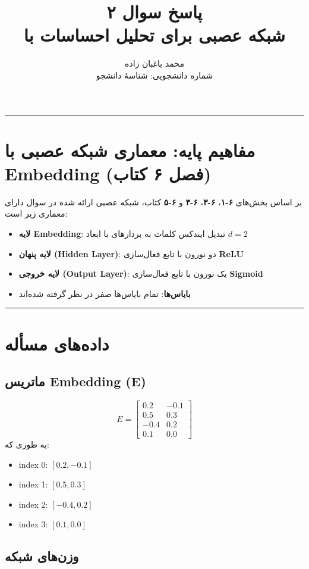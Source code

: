 \documentclass[11pt,a4paper]{article}
\title{\textbf{پاسخ سوال ۲} \\[0.4cm] \small شبکه عصبی برای تحلیل احساسات با \en{Embedding}}
\author{محمد باغبان زاده \\ شماره دانشجویی: شناسهٔ دانشجو}
\date{}
\newcommand{\en}[1]{\textenglish{#1}}
\newcommand{\separator}{\vspace{1em}\noindent\rule{\linewidth}{0.4pt}\vspace{1em}}
\newcommand{\thickseparator}{\vspace{1em}\noindent\rule{\linewidth}{1pt}\vspace{1em}}
\begin{document}
\maketitle
\thickseparator

\section{مفاهیم پایه: معماری شبکه عصبی با \en{Embedding} (فصل \en{۶} کتاب)}

بر اساس بخش‌های \textbf{\en{۶-۱}}، \textbf{\en{۶-۳}}، \textbf{\en{۶-۴}} و \textbf{\en{۶-۵}} کتاب، شبکه عصبی ارائه شده در سوال دارای معماری زیر است:

\begin{itemize}
    \item \textbf{لایه \en{Embedding}}: تبدیل ایندکس کلمات به بردارهای با ابعاد \(d=2\)
    \item \textbf{لایه پنهان (\en{Hidden Layer})}: دو نورون با تابع فعال‌سازی \textbf{\en{ReLU}}
    \item \textbf{لایه خروجی (\en{Output Layer})}: یک نورون با تابع فعال‌سازی \textbf{\en{Sigmoid}}
    \item \textbf{بایاس‌ها}: تمام بایاس‌ها صفر در نظر گرفته شده‌اند
\end{itemize}

\separator
\section{داده‌های مسأله}

\subsection{ماتریس \en{Embedding} (E)}
\[
E = 
\begin{bmatrix}
0.2 & -0.1 \\
0.5 & 0.3 \\
-0.4 & 0.2 \\
0.1 & 0.0
\end{bmatrix}
\]
به طوری که:
\begin{itemize}
    \item \en{index 0}: \( [0.2, -0.1] \)
    \item \en{index 1}: \( [0.5, 0.3] \)
    \item \en{index 2}: \( [-0.4, 0.2] \)
    \item \en{index 3}: \( [0.1, 0.0] \)
\end{itemize}

\subsection{وزن‌های شبکه}
\end{document}
